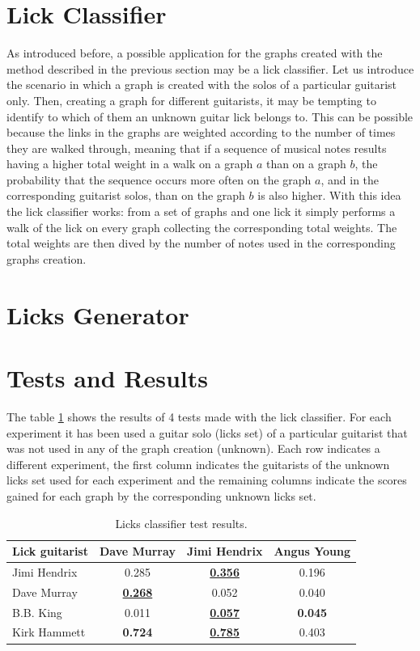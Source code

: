 \documentclass{llncs}
\begin{document}
\section{Lick Classifier}
As introduced before, a possible application for the graphs created with
the method described in the previous section may be a lick classifier.
Let us introduce the scenario in which a graph is created with the solos
of a particular guitarist only. Then, creating a graph for different
guitarists, it may be tempting to identify to which of them an unknown
guitar lick belongs to. This can be possible because the links in the
graphs are weighted according to the number of times they are walked
through, meaning that if a sequence of musical notes results having
a higher 
total weight in a walk on a graph $a$ than on a graph $b$, the probability that the sequence 
occurs more often on the graph $a$, and in the
corresponding guitarist solos, than on the graph $b$ is also higher.
With this idea the lick classifier works: from a set of graphs and one
lick it simply performs a walk of the lick on every graph collecting the
corresponding total weights. The total weights are then dived by the
number of notes used in the corresponding graphs creation.

\section{Licks Generator}

\section{Tests and Results}
The table \ref{tab:classifier} shows the results of 4 tests
made with the lick classifier. For each experiment it has been used a
guitar solo (licks set) of a particular guitarist that was not used in
any of the graph creation (unknown). 
Each row indicates a different
experiment, the first column indicates the guitarists of the unknown
licks set used
for each experiment and the remaining columns indicate the scores gained
for each graph by the corresponding unknown licks set. \setlength{\tabcolsep}{8pt}
\begin{table}
\begin{center}
  \begin{tabular}{ l c c c }
    \hline
    Lick guitarist  & Dave Murray & Jimi Hendrix & Angus Young  \\ \hline
	Jimi Hendrix & 0.285 & \underline{\textbf{0.356}} & 0.196 \\
    Dave Murray & \underline{\textbf{0.268}} & 0.052 & 0.040 \\
	B.B. King & 0.011 & \underline{\textbf{0.057}} & \textbf{0.045} \\
	Kirk Hammett & \textbf{0.724} & \underline{\textbf{0.785}} & 0.403 \\
  \end{tabular}
\end{center}
\caption{Licks classifier test results.}
\label{tab:classifier}
\end{table}
\end{document}
